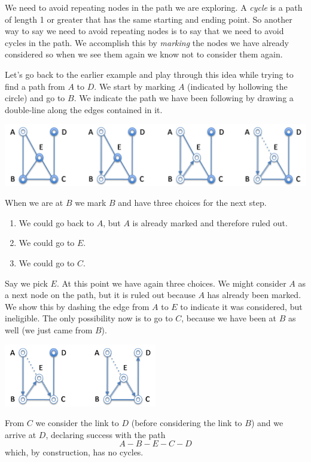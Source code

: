 We need to avoid repeating nodes in the path we are exploring.  A
\emph{cycle} is a path of length 1 or greater that has the same
starting and ending point.  So another way to say we need to avoid
repeating nodes is to say that we need to avoid cycles in the path.
We accomplish this by \emph{marking} the nodes we have already
considered so when we see them again we know not to consider them
again.

Let's go back to the earlier example and play through this idea while
trying to find a path from $A$ to $D$.  We start by marking $A$
(indicated by hollowing the circle) and go to $B$.  We indicate the
path we have been following by drawing a double-line along the edges
contained in it.
\begin{center}
  \includegraphics[width=\textwidth]{img/dfs1.png}
\end{center}
When we are at $B$ we mark $B$ and have three choices for the next
step.
\begin{enumerate}
\item%
  We could go back to $A$, but $A$ is already marked and therefore
  ruled out.
\item%
  We could go to $E$.
\item%
  We could go to $C$.
\end{enumerate}
Say we pick $E$.  At this point we have again three choices.  We might
consider $A$ as a next node on the path, but it is ruled out because
$A$ has already been marked.  We show this by dashing the edge from
$A$ to $E$ to indicate it was considered, but ineligible.  The only
possibility now is to go to $C$, because we have been at $B$ as well
(we just came from $B$).
\begin{center}
  \includegraphics[width=0.5\textwidth]{img/dfs2.png}
\end{center}
From $C$ we consider the link to $D$ (before considering the link to
$B$) and we arrive at $D$, declaring success with the path
$$
A-B-E-C-D
$$
which, by construction, has no cycles.

